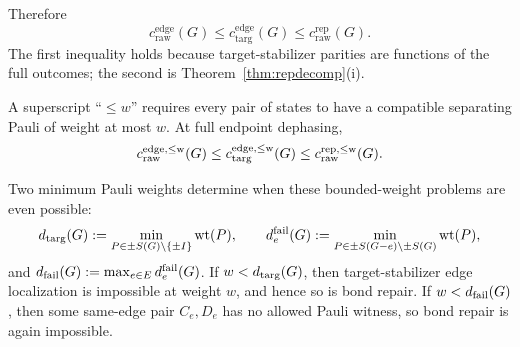 \documentclass[11pt]{article}
\theoremstyle{remark}
\newcommand{\cdiag}{c_{\mathrm{targ}}^{\mathrm{edge}}}
\newcommand{\ccutraw}{c_{\mathrm{raw}}^{\mathrm{edge}}}
\newcommand{\crep}{c_{\mathrm{raw}}^{\mathrm{rep}}}
\begin{document}
Therefore
\begin{equation}\label{eq:settinghierarchy}
\boxed{\ccutraw(G)\le\cdiag(G)\le\crep(G).}
\end{equation}
The first inequality holds because target-stabilizer parities are functions of the full outcomes; the second is Theorem~\ref{thm:repdecomp}(i).

A superscript ``\(\le w\)'' requires every pair of states to have a compatible separating Pauli of weight at most \(w\).  At full endpoint dephasing,
\begin{equation}\label{eq:weighthierarchy}
c_{\rm raw}^{\rm edge,\le w}(G)
\le c_{\rm targ}^{\rm edge,\le w}(G)
\le c_{\rm raw}^{\rm rep,\le w}(G).
\end{equation}

Two minimum Pauli weights determine when these bounded-weight problems are even possible:
\[
d_{\rm targ}(G):=\min_{P\in\pm S(G)\setminus\{\pm I\}}\mathrm{wt}(P),
\qquad
d_e^{\rm fail}(G):=\min_{P\in\pm S(G-e)\setminus\pm S(G)}\mathrm{wt}(P),
\]
and \(d_{\rm fail}(G):=\max_{e\in E}d_e^{\rm fail}(G)\).
If \(w<d_{\rm targ}(G)\), then target-stabilizer edge localization is impossible at weight \(w\), and hence so is bond repair.  If \(w<d_{\rm fail}(G)\), then some same-edge pair \(C_e,D_e\) has no allowed Pauli witness, so bond repair is again impossible.
\end{document}
